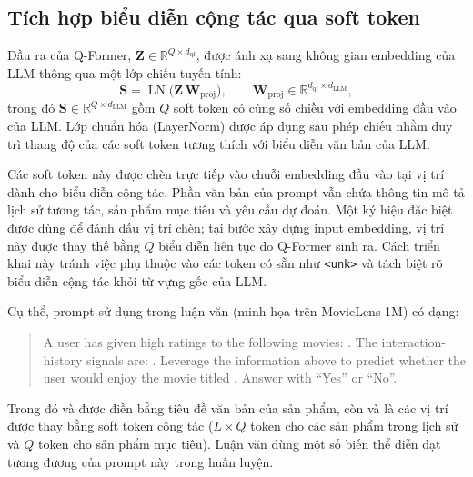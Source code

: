 \subsection{Tích hợp biểu diễn cộng tác qua soft token}
\label{ssec:hai-duong}

Đầu ra của Q-Former, $\mathbf{Z} \in \mathbb{R}^{Q \times d_{\text{qf}}}$, được ánh xạ sang
không gian embedding của LLM thông qua một lớp chiếu tuyến tính:
\begin{equation}\label{eq:soft-proj}
\mathbf{S} = \operatorname{LN}\!\big(\mathbf{Z}\,\mathbf{W}_{\text{proj}}\big), \qquad
\mathbf{W}_{\text{proj}} \in \mathbb{R}^{d_{\text{qf}} \times d_{\text{LLM}}},
\end{equation}
trong đó $\mathbf{S} \in \mathbb{R}^{Q \times d_{\text{LLM}}}$ gồm $Q$ soft token có cùng số
chiều với embedding đầu vào của LLM. Lớp chuẩn hóa (LayerNorm) được áp dụng sau phép chiếu nhằm
duy trì thang độ của các soft token tương thích với biểu diễn văn bản của LLM.

Các soft token này được chèn trực tiếp vào chuỗi embedding đầu vào tại vị trí dành cho biểu diễn
cộng tác. Phần văn bản của prompt vẫn chứa thông tin mô tả lịch sử tương tác, sản phẩm mục tiêu
và yêu cầu dự đoán. Một ký hiệu đặc biệt được dùng để đánh dấu vị trí chèn; tại bước xây dựng
input embedding, vị trí này được thay thế bằng $Q$ biểu diễn liên tục do Q-Former sinh ra. Cách
triển khai này tránh việc phụ thuộc vào các token có sẵn như \verb|<unk>| và tách biệt rõ biểu
diễn cộng tác khỏi từ vựng gốc của LLM.

Cụ thể, prompt sử dụng trong luận văn (minh họa trên MovieLens-1M) có dạng:
\begin{quote}
\small\ttfamily\raggedright
A user has given high ratings to the following movies: . The
interaction-history signals are: . Leverage the information above
to predict whether the user would enjoy the movie titled .
 Answer with ``Yes'' or ``No''.
\end{quote}
Trong đó  và  được điền bằng
tiêu đề văn bản của sản phẩm, còn  và
 là các vị trí được thay bằng soft token cộng tác ($L \times Q$
token cho các sản phẩm trong lịch sử và $Q$ token cho sản phẩm mục tiêu). Luận văn dùng một số
biến thể diễn đạt tương đương của prompt này trong huấn luyện.

